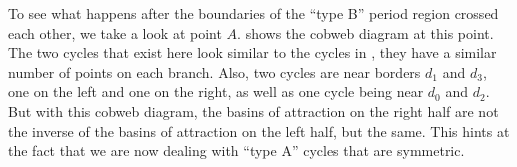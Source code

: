 To see what happens after the boundaries of the ``type B'' period region crossed each other, we take a look at point $A$.
 shows the cobweb diagram at this point.
The two cycles that exist here look similar to the cycles in , they have a similar number of points on each branch.
Also, two cycles are near borders $d_1$ and $d_3$, one on the left and one on the right, as well as one cycle being near $d_0$ and $d_2$.
But with this cobweb diagram, the basins of attraction on the right half are not the inverse of the basins of attraction on the left half, but the same.
This hints at the fact that we are now dealing with ``type A'' cycles that are symmetric.


